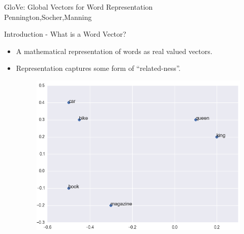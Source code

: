 \begin{frame}
  \begin{center}
    {
      \huge GloVe: Global Vectors for Word Representation
    } \\
    Pennington,Socher,Manning
  \end{center}
\end{frame}

\begin{frame}{Introduction - What is a Word Vector?}
  \begin{itemize}[<+->]
  \item A mathematical representation of words as real valued vectors.
  \item Representation captures some form of ``related-ness''.
    \begin{figure}
      \includegraphics[scale=0.35]{images/wordvec.png}
    \end{figure}    
  \end{itemize}
\end{frame}


